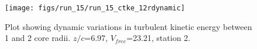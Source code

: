 \begin{figure}[H]
\centering
\texttt{[image: figs/run\_15/run\_15\_ctke\_12rdynamic]}
\caption{Plot showing dynamic variations in turbulent kinetic energy between 1 and 2 core radii. $z/c$=6.97, $V_{free}$=23.21, station 2.}
\label{fig:run_15_ctke_12rdynamic}
\end{figure}


